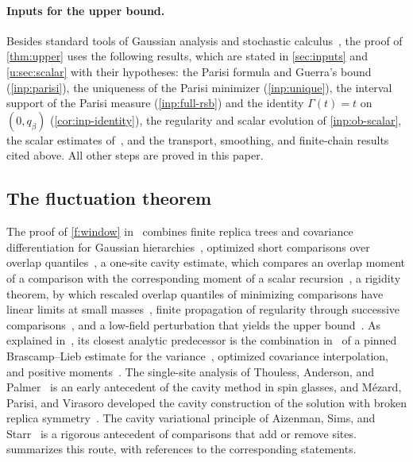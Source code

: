 \paragraph{Inputs for the upper bound.}
Besides standard tools of Gaussian analysis and stochastic
calculus~\cite{tsirelson-ibragimov-sudakov-1976,karatzas-shreve-1991,boucheron-lugosi-massart-2013},
the proof of \cref{thm:upper} uses the following results, which are stated in
\cref{sec:inputs} and \cref{u:sec:scalar} with their hypotheses: the Parisi
formula and Guerra's bound (\cref{inp:parisi}), the uniqueness of the Parisi
minimizer (\cref{inp:unique}), the interval support of the Parisi measure
(\cref{inp:full-rsb}) and the identity $\Gamma(t)=t$ on $(0,q_\beta)$
(\cref{cor:inp-identity}), the regularity and scalar evolution of
\cref{inp:ob-scalar}, the scalar estimates of~\cite[Section~3, Lemmas~3
and~4]{oai-typical-upper}, and the transport, smoothing, and finite-chain
results cited above. All other steps are proved in this paper.

\subsection{The fluctuation theorem}

The proof of \cref{f:window} in~\cite{oai-fluctuations} combines finite
replica trees and covariance differentiation for Gaussian
hierarchies~\cite[Section~2]{oai-fluctuations}, optimized short comparisons
over overlap quantiles~\cite[Section~3]{oai-fluctuations}, a one-site cavity
estimate, which compares an overlap moment of a comparison with the
corresponding moment of a scalar recursion~\cite[Proposition~4.1]{oai-fluctuations},
a rigidity theorem, by which rescaled overlap quantiles of minimizing
comparisons have linear limits at small masses~\cite[Theorem~5.1]{oai-fluctuations},
finite propagation of regularity through successive
comparisons~\cite[Proposition~6.6]{oai-fluctuations}, and a low-field
perturbation that yields the upper bound~\cite[Section~7]{oai-fluctuations}.
As explained in~\cite[Section~1]{oai-fluctuations}, its closest analytic
predecessor is the combination in~\cite{quantitative-parisi} of a pinned
Brascamp--Lieb estimate for the variance~\cite{brascamp-lieb-1976}, optimized
covariance interpolation, and positive
moments~\cite[Propositions~2.2 and~2.3 and Section~3]{quantitative-parisi}.
The single-site analysis of Thouless, Anderson, and
Palmer~\cite{thouless-anderson-palmer-1977} is an early antecedent of the cavity
method in spin glasses, and M\'ezard, Parisi, and Virasoro developed
the cavity construction of the solution with broken replica
symmetry~\cite{mezard-parisi-virasoro-1986}. The cavity variational principle
of Aizenman, Sims, and Starr~\cite{aizenman-sims-starr-2003} is a rigorous
antecedent of comparisons that add or remove sites.  summarizes this route, with
references to the corresponding statements.


